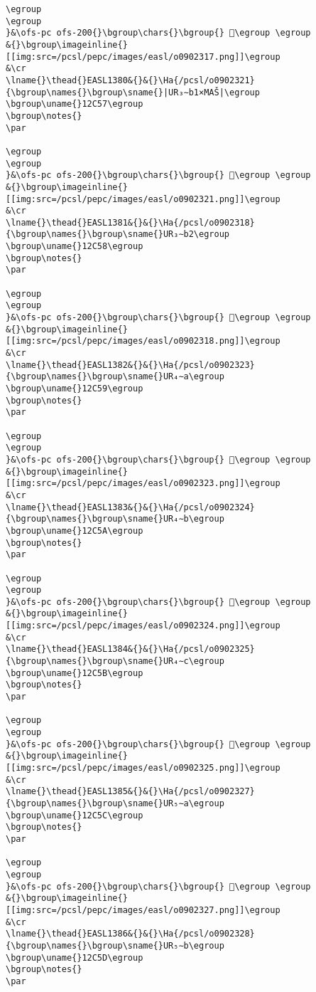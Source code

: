 \begin{verbatim}
\egroup
\egroup
}&\ofs-pc ofs-200{}\bgroup\chars{}\bgroup{} 𒱖\egroup \egroup
&{}\bgroup\imageinline{}[[img:src=/pcsl/pepc/images/easl/o0902317.png]]\egroup
&\cr
\lname{}\thead{}EASL1380&{}&{}\Ha{/pcsl/o0902321}{\bgroup\names{}\bgroup\sname{}|UR₃∼b1×MAŠ|\egroup
\bgroup\uname{}12C57\egroup
\bgroup\notes{}
\par 

\egroup
\egroup
}&\ofs-pc ofs-200{}\bgroup\chars{}\bgroup{} 𒱗\egroup \egroup
&{}\bgroup\imageinline{}[[img:src=/pcsl/pepc/images/easl/o0902321.png]]\egroup
&\cr
\lname{}\thead{}EASL1381&{}&{}\Ha{/pcsl/o0902318}{\bgroup\names{}\bgroup\sname{}UR₃∼b2\egroup
\bgroup\uname{}12C58\egroup
\bgroup\notes{}
\par 

\egroup
\egroup
}&\ofs-pc ofs-200{}\bgroup\chars{}\bgroup{} 𒱘\egroup \egroup
&{}\bgroup\imageinline{}[[img:src=/pcsl/pepc/images/easl/o0902318.png]]\egroup
&\cr
\lname{}\thead{}EASL1382&{}&{}\Ha{/pcsl/o0902323}{\bgroup\names{}\bgroup\sname{}UR₄∼a\egroup
\bgroup\uname{}12C59\egroup
\bgroup\notes{}
\par 

\egroup
\egroup
}&\ofs-pc ofs-200{}\bgroup\chars{}\bgroup{} 𒱙\egroup \egroup
&{}\bgroup\imageinline{}[[img:src=/pcsl/pepc/images/easl/o0902323.png]]\egroup
&\cr
\lname{}\thead{}EASL1383&{}&{}\Ha{/pcsl/o0902324}{\bgroup\names{}\bgroup\sname{}UR₄∼b\egroup
\bgroup\uname{}12C5A\egroup
\bgroup\notes{}
\par 

\egroup
\egroup
}&\ofs-pc ofs-200{}\bgroup\chars{}\bgroup{} 𒱚\egroup \egroup
&{}\bgroup\imageinline{}[[img:src=/pcsl/pepc/images/easl/o0902324.png]]\egroup
&\cr
\lname{}\thead{}EASL1384&{}&{}\Ha{/pcsl/o0902325}{\bgroup\names{}\bgroup\sname{}UR₄∼c\egroup
\bgroup\uname{}12C5B\egroup
\bgroup\notes{}
\par 

\egroup
\egroup
}&\ofs-pc ofs-200{}\bgroup\chars{}\bgroup{} 𒱛\egroup \egroup
&{}\bgroup\imageinline{}[[img:src=/pcsl/pepc/images/easl/o0902325.png]]\egroup
&\cr
\lname{}\thead{}EASL1385&{}&{}\Ha{/pcsl/o0902327}{\bgroup\names{}\bgroup\sname{}UR₅∼a\egroup
\bgroup\uname{}12C5C\egroup
\bgroup\notes{}
\par 

\egroup
\egroup
}&\ofs-pc ofs-200{}\bgroup\chars{}\bgroup{} 𒱜\egroup \egroup
&{}\bgroup\imageinline{}[[img:src=/pcsl/pepc/images/easl/o0902327.png]]\egroup
&\cr
\lname{}\thead{}EASL1386&{}&{}\Ha{/pcsl/o0902328}{\bgroup\names{}\bgroup\sname{}UR₅∼b\egroup
\bgroup\uname{}12C5D\egroup
\bgroup\notes{}
\par 


\end{verbatim}
